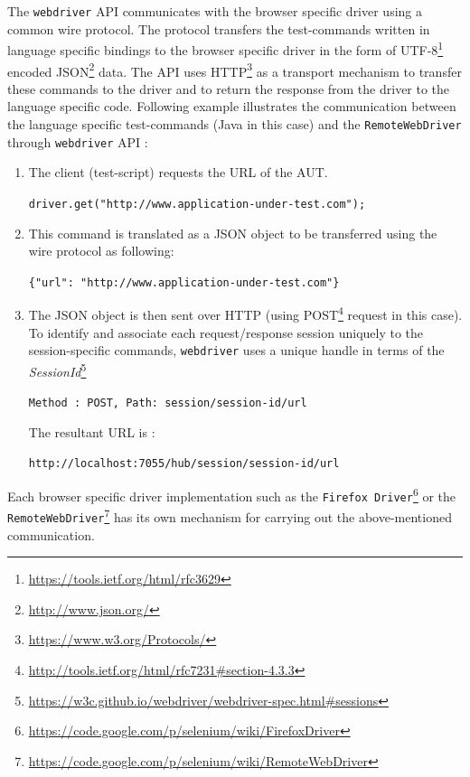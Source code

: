 The \texttt{webdriver} API communicates with the browser specific driver using a common wire protocol. The protocol transfers the test-commands written in language specific bindings to the browser specific driver in the form of UTF-8\footnote{\url{https://tools.ietf.org/html/rfc3629}} encoded JSON\footnote{\url{http://www.json.org/}} data. The API uses HTTP\footnote{\url{https://www.w3.org/Protocols/}} as a transport mechanism to transfer these commands to the driver and to return the response from the driver to the language specific code. 
\noindent 
Following example illustrates the communication between the language specific test-commands (Java in this case) and the \texttt{RemoteWebDriver} through \texttt{webdriver} API :
\begin{enumerate}
\item The client (test-script) requests the URL of the AUT.\\
\begin{small}
\texttt{driver.get("http://www.application-under-test.com");}
\end{small}
\item This command is translated as a JSON object to be transferred using the wire protocol as following:\\
\begin{small}
\texttt{\{"url": "http://www.application-under-test.com"\}}
\end{small}
\item The JSON object is then sent over HTTP (using POST\footnote{\url{http://tools.ietf.org/html/rfc7231\#section-4.3.3}} request in this case). To identify and associate each request/response session uniquely to the session-specific commands, \texttt{webdriver} uses a unique handle in terms of the \textit{SessionId}\footnote{\url{https://w3c.github.io/webdriver/webdriver-spec.html\#sessions}}\\
\begin{small}
\texttt{Method : POST, Path: session/{session-id}/url}\\
\end{small}
The resultant URL is :\\
\begin{small}
\texttt{http://localhost:7055/hub/session/{session-id}/url}
\end{small}
\end{enumerate}

Each browser specific driver implementation such as the \texttt{Firefox Driver}\footnote{\url{https://code.google.com/p/selenium/wiki/FirefoxDriver}} or the \texttt{RemoteWebDriver}\footnote{\url{https://code.google.com/p/selenium/wiki/RemoteWebDriver}} has its own mechanism for carrying out the above-mentioned communication. 

